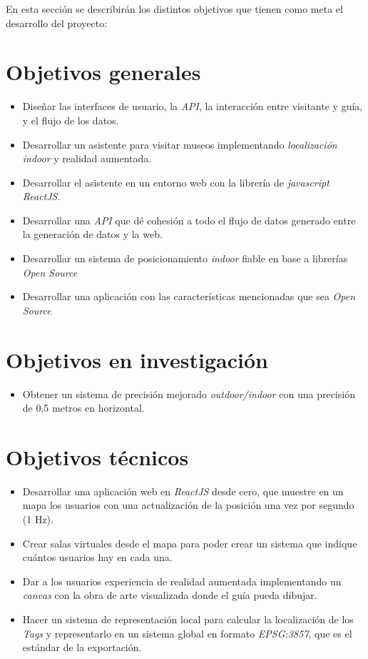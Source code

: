 En esta sección se describirán los distintos objetivos que tienen como meta el desarrollo del proyecto:
\section{Objetivos generales}
\begin{itemize}
  \item Diseñar las interfaces de usuario, la \textit{API}, la interacción entre visitante y guía, y el flujo de los datos.
  \item Desarrollar un asistente para visitar museos implementando \textit{localización indoor} y realidad aumentada.
  \item Desarrollar el asistente en un entorno web con la librería de \textit{javascript} \textit{ReactJS}.
  \item Desarrollar una \textit{API} que dé cohesión a todo el flujo de datos generado entre la generación de datos y la web.
  \item Desarrollar un sistema de posicionamiento \textit{indoor} fiable en base a librerías \textit{Open Source}
  \item Desarrollar una aplicación con las características mencionadas que sea  \textit{Open Source}
  
\end{itemize}
\section{Objetivos en investigación}
\begin{itemize}

  \item Obtener un sistema de precisión mejorado \textit{outdoor/indoor} con una precisión de 0,5 metros en horizontal.
\end{itemize}

\section{Objetivos técnicos}
\begin{itemize}
  \item Desarrollar una aplicación web en \textit{ReactJS} desde cero, que muestre en un mapa los usuarios con una actualización de la posición una vez por segundo (1 Hz).
  \item Crear salas virtuales desde el mapa para poder crear un sistema que indique cuántos usuarios hay en cada una.
  \item Dar a los usuarios experiencia de realidad aumentada implementando un \textit{canvas} con la obra de arte visualizada donde el guía pueda dibujar.
  \item Hacer un sistema de representación local para calcular la localización de los \textit{Tags} y representarlo en un sistema global en formato \textit{EPSG:3857}, que es el estándar de la exportación.
  
\end{itemize}
